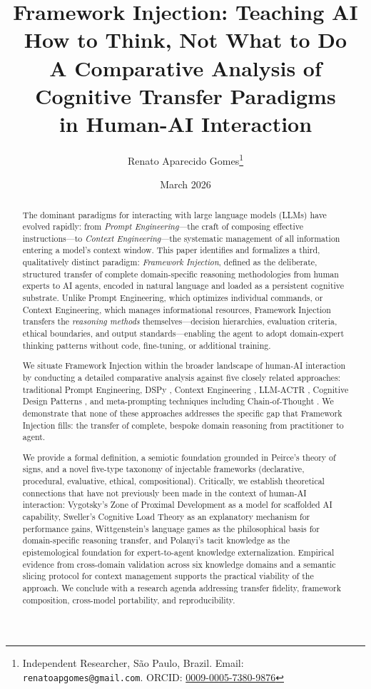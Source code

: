 \documentclass[12pt,a4paper]{article}
\title{\textbf{Framework Injection: Teaching AI How to Think, Not What to Do}\\[0.5em]
\large A Comparative Analysis of Cognitive Transfer Paradigms\\in Human-AI Interaction}
\author{Renato Aparecido Gomes\thanks{Independent Researcher, S\~{a}o Paulo, Brazil. Email: \texttt{renatoapgomes@gmail.com}. ORCID: \href{https://orcid.org/0009-0005-7380-9876}{0009-0005-7380-9876}}}
\date{March 2026}
\begin{document}
\maketitle

\begin{abstract}
The dominant paradigms for interacting with large language models (LLMs) have evolved rapidly: from \emph{Prompt Engineering}---the craft of composing effective instructions---to \emph{Context Engineering}---the systematic management of all information entering a model's context window. This paper identifies and formalizes a third, qualitatively distinct paradigm: \emph{Framework Injection}, defined as the deliberate, structured transfer of complete domain-specific reasoning methodologies from human experts to AI agents, encoded in natural language and loaded as a persistent cognitive substrate. Unlike Prompt Engineering, which optimizes individual commands, or Context Engineering, which manages informational resources, Framework Injection transfers the \emph{reasoning methods} themselves---decision hierarchies, evaluation criteria, ethical boundaries, and output standards---enabling the agent to adopt domain-expert thinking patterns without code, fine-tuning, or additional training.

We situate Framework Injection within the broader landscape of human-AI interaction by conducting a detailed comparative analysis against five closely related approaches: traditional Prompt Engineering, DSPy \citep{khattab2023dspy}, Context Engineering \citep{anthropic2025context}, LLM-ACTR \citep{wu2025cognitive}, Cognitive Design Patterns \citep{agi2025cognitive}, and meta-prompting techniques including Chain-of-Thought \citep{wei2022chain}. We demonstrate that none of these approaches addresses the specific gap that Framework Injection fills: the transfer of complete, bespoke domain reasoning from practitioner to agent.

We provide a formal definition, a semiotic foundation grounded in Peirce's theory of signs, and a novel five-type taxonomy of injectable frameworks (declarative, procedural, evaluative, ethical, compositional). Critically, we establish theoretical connections that have not previously been made in the context of human-AI interaction: Vygotsky's Zone of Proximal Development as a model for scaffolded AI capability, Sweller's Cognitive Load Theory as an explanatory mechanism for performance gains, Wittgenstein's language games as the philosophical basis for domain-specific reasoning transfer, and Polanyi's tacit knowledge as the epistemological foundation for expert-to-agent knowledge externalization. Empirical evidence from cross-domain validation across six knowledge domains and a semantic slicing protocol for context management supports the practical viability of the approach. We conclude with a research agenda addressing transfer fidelity, framework composition, cross-model portability, and reproducibility.
\end{abstract}
\end{document}
